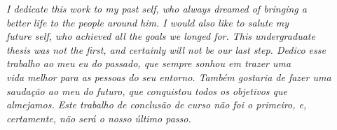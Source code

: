 


\begin{dedicatoria}

    \vspace*{\fill}
    \centering
    \noindent
    \textit{\lang
    {
        I dedicate this work to my past self, who always dreamed of bringing a \\
        better life to the people around him. I would also like to salute my \\
        future self, who achieved all the goals we longed for. This undergraduate \\
        thesis was not the first, and certainly will not be our last step.
    }
    {
        Dedico esse trabalho ao meu eu do passado, que sempre sonhou em trazer uma \\
        vida melhor para as pessoas do seu entorno. Também gostaria de fazer uma \\
        saudação ao meu do futuro, que conquistou todos os objetivos que \\
        almejamos. Este trabalho de conclusão de curso não foi o primeiro, e, \\
        certamente, não será o nosso último passo.
    }}
    \vspace*{\fill}

\end{dedicatoria}
